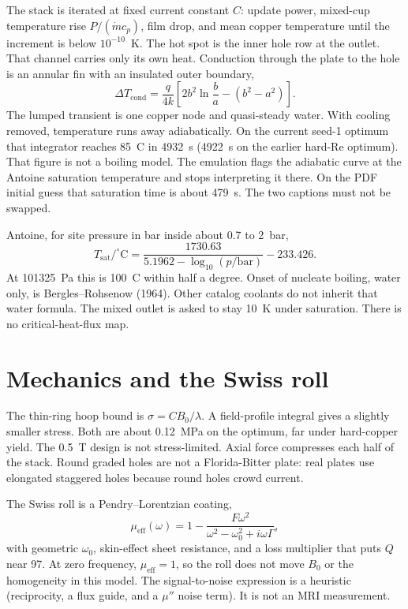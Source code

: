 \documentclass[11pt]{article}
\begin{document}
The stack is iterated at fixed current constant $C$: update power, mixed-cup temperature rise $P/(\dot m c_p)$, film drop, and mean copper temperature until the increment is below $10^{-10}$~K.
The hot spot is the inner hole row at the outlet.
That channel carries only its own heat.
Conduction through the plate to the hole is an annular fin with an insulated outer boundary,
\begin{equation}
\Delta T_{\mathrm{cond}} = \frac{q}{4k}\left[2b^2\ln\frac{b}{a}-(b^2-a^2)\right].
\end{equation}
The lumped transient is one copper node and quasi-steady water.
With cooling removed, temperature runs away adiabatically.
On the current seed-1 optimum that integrator reaches 85~C in 4932~s (4922~s on the earlier hard-Re optimum).
That figure is not a boiling model.
The emulation flags the adiabatic curve at the Antoine saturation temperature and stops interpreting it there.
On the PDF initial guess that saturation time is about 479~s.
The two captions must not be swapped.

Antoine, for site pressure in bar inside about 0.7 to 2~bar,
\begin{equation}
T_{\mathrm{sat}}/^\circ\mathrm{C} = \frac{1730.63}{5.1962-\log_{10}(p/\mathrm{bar})}-233.426.
\end{equation}
At 101325~Pa this is 100~C within half a degree.
Onset of nucleate boiling, water only, is Bergles--Rohsenow (1964).
Other catalog coolants do not inherit that water formula.
The mixed outlet is asked to stay 10~K under saturation.
There is no critical-heat-flux map.

\section{Mechanics and the Swiss roll}

The thin-ring hoop bound is $\sigma = C B_0/\lambda$.
A field-profile integral gives a slightly smaller stress.
Both are about 0.12~MPa on the optimum, far under hard-copper yield.
The 0.5~T design is not stress-limited.
Axial force compresses each half of the stack.
Round graded holes are not a Florida-Bitter plate: real plates use elongated staggered holes because round holes crowd current.

The Swiss roll is a Pendry--Lorentzian coating,
\begin{equation}
\mu_{\mathrm{eff}}(\omega)=1-\frac{F\omega^2}{\omega^2-\omega_0^2+i\omega\Gamma},
\end{equation}
with geometric $\omega_0$, skin-effect sheet resistance, and a loss multiplier that puts $Q$ near 97.
At zero frequency, $\mu_{\mathrm{eff}}=1$, so the roll does not move $B_0$ or the homogeneity in this model.
The signal-to-noise expression is a heuristic (reciprocity, a flux guide, and a $\mu''$ noise term).
It is not an MRI measurement.
\end{document}
